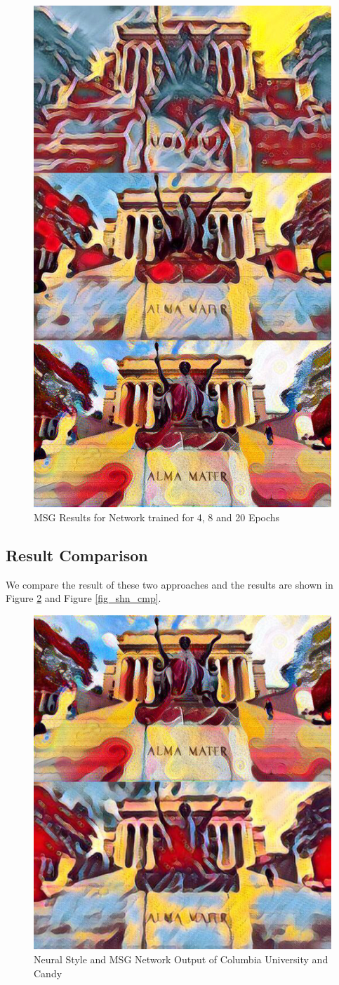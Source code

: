 \documentclass[10pt,twocolumn,letterpaper]{article}
\begin{document}
\begin{figure}[t]
\begin{center}
\includegraphics[width=0.6\linewidth]{images/msg_epoch_combine.jpg}
\end{center}
\caption{MSG Results for Network trained for 4, 8 and 20 Epochs}
\label{fig:long}
\label{fig:onecol}
\label{fig_msg}
\end{figure}

\subsection{Result Comparison}

We compare the result of these two approaches and the results are shown in Figure \ref{fig_col_cmp} and Figure \ref{fig_shn_cmp}.

\begin{figure}[t]
\begin{center}
\includegraphics[width=0.6\linewidth]{images/col_cmp.jpg}
\end{center}
\caption{Neural Style and MSG Network Output of Columbia University and Candy}
\label{fig:long}
\label{fig:onecol}
\label{fig_col_cmp}
\end{figure}
\end{document}
